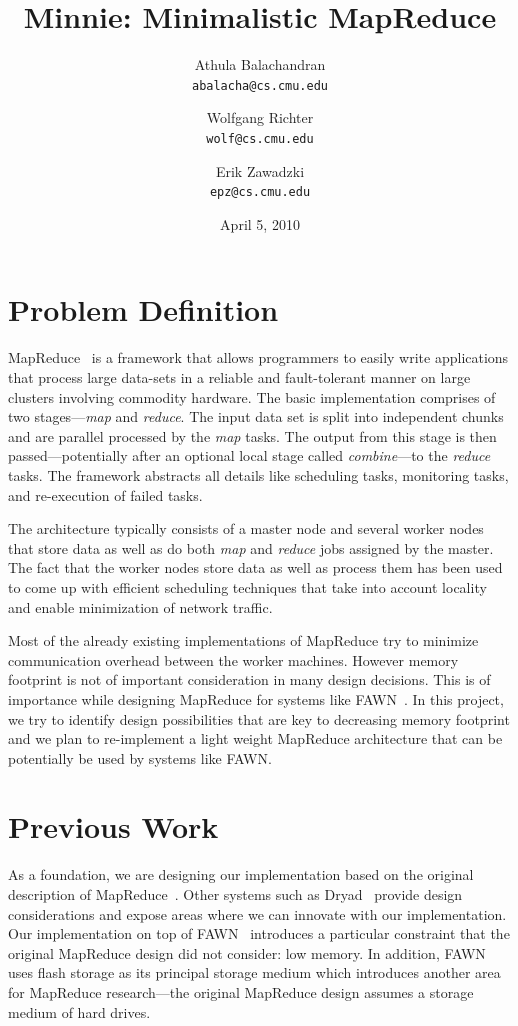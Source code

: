 \documentclass[10pt,letter,final,article,twocolumn]{article} %
\title{Minnie: Minimalistic MapReduce}
\author{Athula Balachandran \\
{\tt abalacha@cs.cmu.edu}
\and
Wolfgang Richter \\
{\tt wolf@cs.cmu.edu}
\and
Erik Zawadzki \\
{\tt epz@cs.cmu.edu}}
\date{April 5, 2010} %
\begin{document}

\maketitle

\section{Problem Definition}
MapReduce~\citep{mapreduce08} is a framework that allows programmers to easily write applications that process large data-sets in a reliable and fault-tolerant manner on large clusters involving commodity hardware. The basic implementation  comprises of two stages---\emph{map} and \emph{reduce}. The input data set is split into independent chunks and are parallel processed by the \emph{map} tasks. The output from this stage is then passed---potentially after an optional local stage called \emph{combine}---to the \emph{reduce} tasks. The framework abstracts all details like scheduling tasks, monitoring tasks, and re-execution of failed tasks. 

The architecture typically consists of a master node and several worker nodes that store data as well as do both \emph{map} and \emph{reduce} jobs assigned by the master. The fact that the worker nodes store data as well as process them has been used to come up with efficient scheduling techniques that take into account locality and enable minimization of network traffic.

Most of the already existing implementations of MapReduce try to minimize communication overhead between the worker machines. However memory footprint is not of important consideration in many design decisions. This is of importance while designing MapReduce for systems like FAWN~\citep{fawn09}. In this project, we try to identify design possibilities that are key to decreasing memory footprint and we plan to re-implement a light weight MapReduce architecture that can be potentially be used by systems like FAWN.

\section{Previous Work}

As a foundation, we are designing our implementation based on the original 
description of MapReduce~\citep{mapreduce08}.  Other systems such as
Dryad~\citep{dryad07} provide design considerations and expose areas
where we can innovate with our implementation.  Our implementation on top
of FAWN~\citep{fawn09} introduces a particular constraint that the original
MapReduce design did not consider: low memory.  In addition, FAWN uses
flash storage as its principal storage medium which introduces another
area for MapReduce research---the original MapReduce design assumes a
storage medium of hard drives.  
\end{document}
